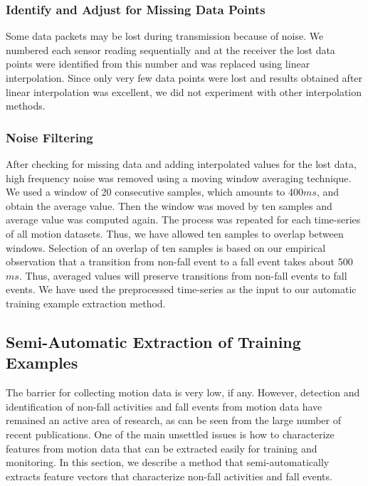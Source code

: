 \documentclass[]{IEEEtran}
\begin{document}
\subsubsection{Identify and Adjust for Missing Data Points}
\label{sec:IdentifyAndAdjustForMissingDataPoints}
Some data packets may be lost during transmission because of noise. We numbered each 
sensor reading sequentially and at the receiver the lost data points were identified from this number and was 
replaced using linear interpolation. Since only very few data points were lost and 
results obtained after linear interpolation was excellent, we did not experiment with other 
interpolation methods.



\subsubsection{Noise Filtering}
\label{sec:NoiseFiltering}

After checking for missing data and adding interpolated values for the lost data,  high frequency noise was removed using a moving window averaging technique. We used a window  of 20 consecutive samples, which amounts to 400$ms$, 
and obtain the average value. Then the  window was moved by ten samples and average  value was computed again. The
process was repeated for each time-series of all motion datasets. Thus, we have allowed ten samples to overlap between windows. 
Selection of an overlap of ten samples is based on our empirical observation that a transition from non-fall event to a fall event takes about 500$ms$. Thus, averaged values will preserve transitions from non-fall events to fall events.   We have used the preprocessed time-series as the input to our automatic training example 
extraction method.


\subsection{Semi-Automatic  Extraction of Training Examples}

The barrier for collecting motion data is very low, if any. However, detection and identification of non-fall activities and fall events from motion data have remained an active area of research, as can be seen from the large number of recent publications. One of the main unsettled issues is how to characterize features from motion data that can be extracted easily for training and monitoring. In this section, we describe a method that semi-automatically extracts feature vectors that characterize non-fall activities and fall events.
\end{document}
